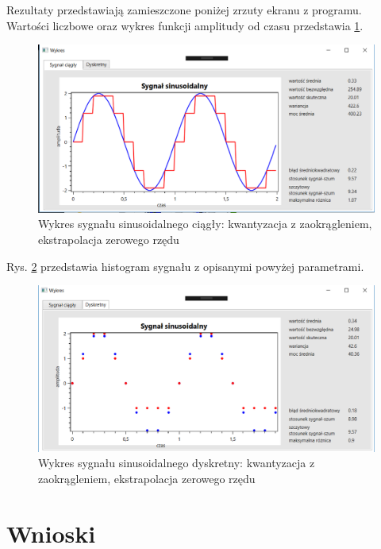 \documentclass[12pt]{article}
\begin{document}
Rezultaty przedstawiają zamieszczone poniżej zrzuty ekranu z programu. Wartości liczbowe oraz wykres funkcji amplitudy od czasu przedstawia \ref{Wykres dla wyników eksperymentu czwartego}.
\begin{figure}[h!]
 \centering
 \includegraphics[width=12.3cm]{SinKwantZaokrEkstA2T2f10H2t1C.PNG}
 \vspace{-0.3cm}
 \caption{Wykres sygnału sinusoidalnego ciągły: kwantyzacja z zaokrągleniem, ekstrapolacja zerowego rzędu}
 \label{Wykres dla wyników eksperymentu czwartego}
\end{figure}

\newpage
Rys. \ref{Histogram dla wyników eksperymentu czwartego} przedstawia histogram sygnału z opisanymi powyżej parametrami. 
\begin{figure}[h!]
 \centering
 \includegraphics[width=12.3cm]{SinKwantZaokrEkstA2T2f10H2t1D.PNG}
 \vspace{-0.3cm}
 \caption{Wykres sygnału sinusoidalnego dyskretny: kwantyzacja z zaokrągleniem, ekstrapolacja zerowego rzędu}
 \label{Histogram dla wyników eksperymentu czwartego}
\end{figure}




\section{Wnioski}
\end{document}
